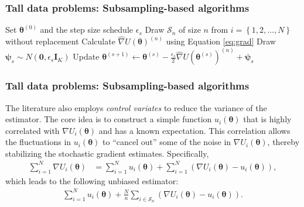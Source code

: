 \documentclass[12pt, compress]{beamer}
\begin{document}
\begin{frame}
	\frametitle{Tall data problems: Subsampling-based algorithms}
\begin{algorithm}[H]
	\caption{Stochastic gradient Langevin dynamic algorithm}\label{Alg:SGLD}
	\begin{algorithmic}[1]
		\State Set $\bm{\theta}^{(0)}$ and the step size schedule $\epsilon_s$  		 			
		\State Draw $\mathcal{S}_n$ of size $n$ from $i=\left\{1,2,\dots,N\right\}$ without replacement
		\State Calculate $\hat{\nabla} U(\boldsymbol{\theta})^{(n)}$ using Equation \ref{eq:grad}  
		\State Draw $\boldsymbol{\psi}_s\sim N(\mathbf{0},\epsilon_s\mathbf{I}_K)$
		\State Update $\boldsymbol{\theta}^{(s+1)}\leftarrow \boldsymbol{\theta}^{(s)} -\frac{\epsilon_s}{2}\hat{\nabla} U(\boldsymbol{\theta}^{(s)})^{(n)}+\boldsymbol{\psi}_s$
		\EndFor 
	\end{algorithmic} 
\end{algorithm}
\end{frame}

\begin{frame}
	\frametitle{Tall data problems: Subsampling-based algorithms}
The literature also employs \textit{control variates} to reduce the variance of the estimator. The core idea is to construct a simple function \( u_i(\boldsymbol{\theta}) \) that is highly correlated with \( \nabla U_i(\boldsymbol{\theta}) \) and has a known expectation. This correlation allows the fluctuations in \( u_i(\boldsymbol{\theta}) \) to ``cancel out'' some of the noise in \( \nabla U_i(\boldsymbol{\theta}) \), thereby stabilizing the stochastic gradient estimates. Specifically,
\begin{align*}
	\sum_{i=1}^N \nabla U_i(\boldsymbol{\theta}) &= \sum_{i=1}^N u_i(\boldsymbol{\theta}) + \sum_{i=1}^N \left( \nabla U_i(\boldsymbol{\theta}) - u_i(\boldsymbol{\theta}) \right),
\end{align*}
which leads to the following unbiased estimator:
\begin{align*}
	\sum_{i=1}^N u_i(\boldsymbol{\theta}) + \frac{N}{n} \sum_{i \in \mathcal{S}_n} \left( \nabla U_i(\boldsymbol{\theta}) - u_i(\boldsymbol{\theta}) \right).
\end{align*}

\end{frame}
\end{document}
